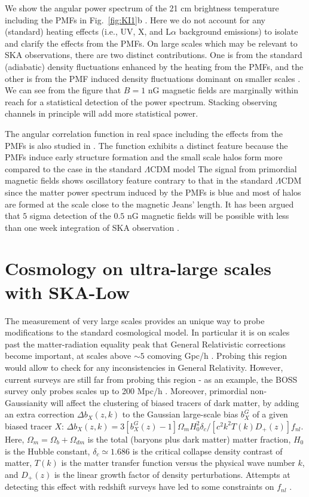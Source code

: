 \documentclass{PoS}
\newcommand{\om}{\Omega_m}
\newcommand{\ob}{\Omega_b}
\newcommand{\odm}{\Omega_{dm}}
\newcommand{\ho}{H_0}
\newcommand{\fnl}{f_{nl}}
\begin{document}
We show the angular power spectrum of the 21 cm brightness temperature
including the PMFs in Fig.~\ref{fig:KI1}b
\cite{2014arXiv1403.2608S}. Here we do not account for any (standard)
heating effects (i.e., UV, X, and L$\alpha$ background emissions) to isolate and
clarify the effects from the PMFs.  On large scales which may be
relevant to SKA 
observations, there are two distinct contributions. One is from the
standard (adiabatic) density fluctuations enhanced by the heating from
the PMFs, and the other is from the PMF induced density fluctuations
dominant on smaller scales
\cite{2006MNRAS.372.1060T,2009ApJ...692..236S}. We can see from the
figure that $B=1$ nG
magnetic fields are marginally within reach for a statistical detection
of the power spectrum. Stacking observing channels in principle will add
more statistical power.

The angular correlation function in real space including the effects
from the PMFs is also studied in \cite{2009JCAP...11..021S}.  The
function exhibits a distinct feature because the PMFs induce early
structure formation and the small scale halos form more compared to the
case in the standard $\Lambda$CDM model The signal from primordial
magnetic fields shows oscillatory feature contrary to that in the
standard $\Lambda$CDM since the matter power spectrum induced by the
PMFs is blue and most of halos are formed at the scale close to the
magnetic Jeans' length. It has been argued that $5$ sigma detection of
the $0.5$ nG magnetic fields will be possible with less than one week
integration of SKA observation \cite{2009JCAP...11..021S}.



\section{Cosmology on ultra-large scales with SKA-Low}

The measurement of very large scales provides an unique way to probe modifications to the standard cosmological model. In particular it is on scales past the matter-radiation equality peak that General Relativistic corrections become important, at scales above $\sim 5$ comoving Gpc/h \citep{2012PhRvD..85b3504J}. Probing this region would allow to check for any inconsistencies in General Relativity. However, current surveys are still far from probing this region - as an example, the BOSS survey only probes scales up to 200 Mpc/h \citep{2012MNRAS.427.3435A}.
Moreover, primordial non-Gaussianity will affect the clustering of biased tracers of dark matter, by adding an extra correction $\Delta b_X(z,k)$ to the Gaussian large-scale bias $b_X^G$ of a given biased tracer $X$: $\Delta b_X(z,k)=3[b_X^G(z)-1]\om\ho^2\delta_c/[c^2k^2T(k)D_+(z)]\fnl$. Here, $\om=\ob+\odm$ is the total (baryons plus dark matter) matter fraction, $\ho$ is the Hubble constant, $\delta_c\simeq1.686$ is the critical collapse density contrast of matter, $T(k)$ is the matter transfer function versus the physical wave number $k$, and $D_+(z)$ is the linear growth factor of density perturbations. Attempts at detecting this effect with redshift surveys have led to some constraints on $\fnl$ \citep{2014PhRvD..89b3511G}.
\end{document}
